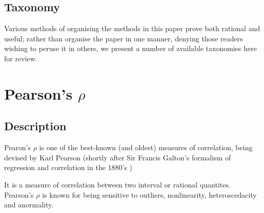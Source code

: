 \documentclass[11pt]{article}
\begin{document}






\subsection{Taxonomy}
Various methods of organising the methods in this paper prove both rational and useful; rather than organise the paper in one manner, denying those readers wishing to peruse it in others, we present a number of available taxonomies here for review.



%
%

\section{Pearson's $\rho$} %
\label{section:pearsonrho}
\subsection{Description}
Pearon's $\rho$ is one of the best-known (and oldest) measures of correlation, being devised by Karl Pearson (shortly after Sir Francis Galton's formalism of regression and correlation in the 1880's \cite{galton1888co}) %

It is a measure of correlation between two interval or rational quantites.  Pearson's $\rho$ is known for being sensitive to outliers, nonlinearity, heteroscedacity and anormality.

\end{document}
